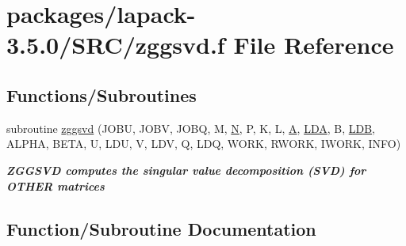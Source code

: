 \hypertarget{zggsvd_8f}{}\section{packages/lapack-\/3.5.0/\+S\+R\+C/zggsvd.f File Reference}
\label{zggsvd_8f}
\subsection*{Functions/\+Subroutines}
\begin{DoxyCompactItemize}
\item 
subroutine \hyperlink{zggsvd_8f_afa4ba38256f4d15e886bb4681fa6e688}{zggsvd} (J\+O\+B\+U, J\+O\+B\+V, J\+O\+B\+Q, M, \hyperlink{polmisc_8c_a0240ac851181b84ac374872dc5434ee4}{N}, P, K, L, \hyperlink{classA}{A}, \hyperlink{example__user_8c_ae946da542ce0db94dced19b2ecefd1aa}{L\+D\+A}, B, \hyperlink{example__user_8c_a50e90a7104df172b5a89a06c47fcca04}{L\+D\+B}, A\+L\+P\+H\+A, B\+E\+T\+A, U, L\+D\+U, V, L\+D\+V, Q, L\+D\+Q, W\+O\+R\+K, R\+W\+O\+R\+K, I\+W\+O\+R\+K, I\+N\+F\+O)
\begin{DoxyCompactList}\small\item\em {\bfseries  Z\+G\+G\+S\+V\+D computes the singular value decomposition (S\+V\+D) for O\+T\+H\+E\+R matrices} \end{DoxyCompactList}\end{DoxyCompactItemize}


\subsection{Function/\+Subroutine Documentation}
\hypertarget{zggsvd_8f_afa4ba38256f4d15e886bb4681fa6e688}{}
